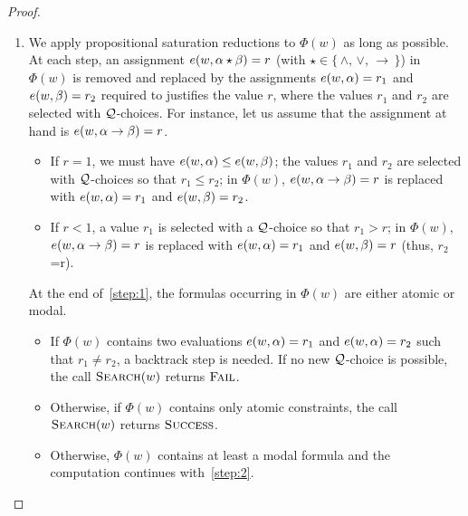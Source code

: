 \begin{proof}
\begin{enumerate}[label*=(Step~\arabic*)]
\item\label{step:1} We apply propositional saturation reductions to
  $\Phi(w)$ as long as possible. At each step, an assignment
  $e(w,\alpha\star\beta)=r$ (with $\star\in \{\,\land,\,\lor,\,\to\,\}$) in
  $\Phi(w)$ is removed and replaced by the assignments $e(w,\alpha)=r_1$
  and $e(w,\beta)=r_2$ required to justifies the value $r$, where the
  values $r_1$ and $r_2$ are selected with $\mathcal{Q}$-choices.  For
  instance, let us assume that the assignment at hand is $e(w,\alpha\to\beta)=r$.
  \begin{itemize}
  \item If $r=1$, we must have $e(w,\alpha) \leq e(w,\beta)$; the values
    $r_1$ and $r_2$ are selected with $\mathcal{Q}$-choices so that $r_1\leq
    r_2$; in $\Phi(w)$, $e(w,\alpha\to \beta)=r$ is replaced with $e(w,\alpha )=
    r_1$ and $e(w,\beta)=r_2$.
  \item If $r<1$, a value $r_1$ is selected with a $\mathcal{Q}$-choice so
    that $r_1> r$; in $\Phi(w)$, $e(w,\alpha\to \beta)=r$ is replaced with
    $e(w,\alpha)= r_1$ and $e(w,\beta) = r$ (thus, $r_2$=r).
  \end{itemize}
  At the end of~\ref{step:1}, the formulas occurring in $\Phi(w)$ are
  either atomic or modal.
  
  \begin{itemize}
  \item If $\Phi(w)$ contains two evaluations $e(w,\alpha)=r_1$ and
    $e(w,\alpha)=r_2$ such that $r_1\neq r_2$, a backtrack step is needed.
    If no new $\mathcal{Q}$-choice is possible, the call $\textsc{Search}(w)$
    returns $\textsc{Fail}$.

  \item Otherwise, if $\Phi(w)$ contains only atomic constraints, the
    call $\textsc{Search}(w)$ returns $\textsc{Success}$.
    
  \item Otherwise, $\Phi(w)$ contains at least  a
    modal formula and the computation continues with~\ref{step:2}.
  \end{itemize}  


\end{enumerate}
\end{proof}
